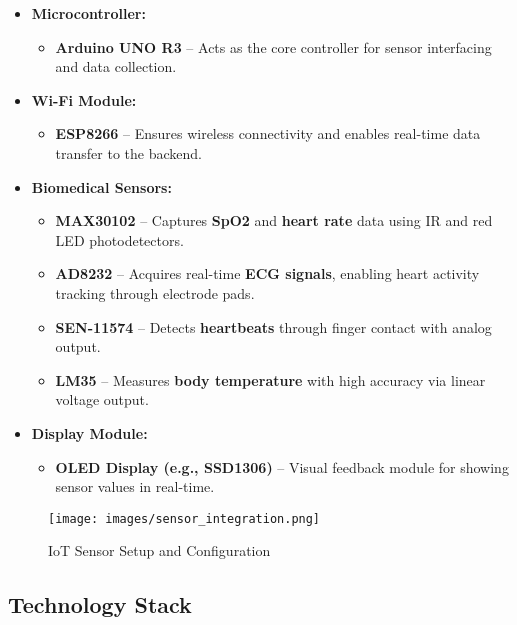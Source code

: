\begin{itemize}
    \item \textbf{Microcontroller:}
    \begin{itemize}
        \item \textbf{Arduino UNO R3} – Acts as the core controller for sensor interfacing and data collection.
    \end{itemize}

    \item \textbf{Wi-Fi Module:}
    \begin{itemize}
        \item \textbf{ESP8266} – Ensures wireless connectivity and enables real-time data transfer to the backend.
    \end{itemize}

    \item \textbf{Biomedical Sensors:}
    \begin{itemize}
        \item \textbf{MAX30102} – Captures \textbf{SpO2} and \textbf{heart rate} data using IR and red LED photodetectors.
        \item \textbf{AD8232} – Acquires real-time \textbf{ECG signals}, enabling heart activity tracking through electrode pads.
        \item \textbf{SEN-11574} – Detects \textbf{heartbeats} through finger contact with analog output.
        \item \textbf{LM35} – Measures \textbf{body temperature} with high accuracy via linear voltage output.
    \end{itemize}

    \item \textbf{Display Module:}
    \begin{itemize}
        \item \textbf{OLED Display (e.g., SSD1306)} – Visual feedback module for showing sensor values in real-time.
    \end{itemize}
\end{itemize}

\begin{figure}[h!]
\centering
\texttt{[image: images/sensor\_integration.png]}
\caption{IoT Sensor Setup and Configuration}
\end{figure}

\subsection{Technology Stack}

